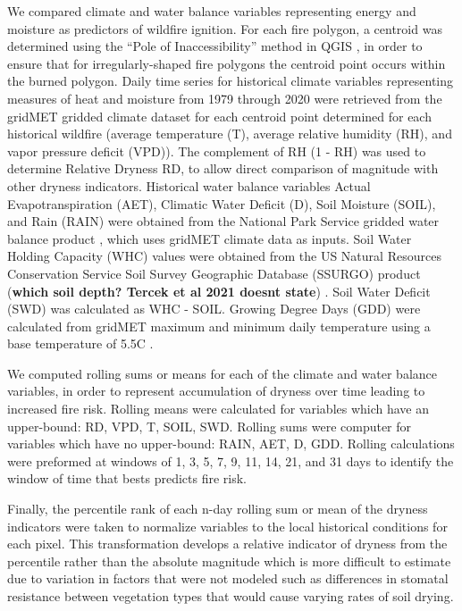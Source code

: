 \documentclass[11pt]{article}
\begin{document}

We compared climate and water balance variables representing energy and moisture as predictors of wildfire ignition. For each fire polygon, a centroid was determined using the ``Pole of Inaccessibility'' method in QGIS \citep{QGIS_software}, in order to ensure that for irregularly-shaped fire polygons the centroid point occurs within the burned polygon. Daily time series for historical climate variables representing measures of heat and moisture from 1979 through 2020 were retrieved from the gridMET gridded climate dataset \citep{abatzoglouDevelopmentGriddedSurface2013} for each centroid point determined for each historical wildfire (average temperature (T), average relative humidity (RH), and vapor pressure deficit (VPD)).  The complement of RH (1 - RH) was used to determine Relative Dryness RD, to allow direct comparison of magnitude with other dryness indicators. Historical water balance variables Actual Evapotranspiration (AET), Climatic Water Deficit (D), Soil Moisture (SOIL), and Rain (RAIN) were obtained from the National Park Service gridded water balance product \citep{tercekHistoricalChangesPlant2021}, which uses gridMET climate data as inputs. Soil Water Holding Capacity (WHC) values were obtained from the US Natural Resources Conservation Service 
Soil Survey Geographic Database (SSURGO) product (\textbf{which soil depth?  Tercek et al 2021 doesnt state}) \citep{naturalresourcesconservationserviceSoilSurveyGeographic2015}. Soil Water Deficit (SWD) was calculated as WHC - SOIL.  Growing Degree Days (GDD) were calculated from gridMET maximum and minimum daily temperature using a base temperature of 5.5\degree C \citep{mcmasterGrowingDegreedaysOne1997}.  

We computed rolling sums or means for each of the climate and water balance variables, in order to represent accumulation of dryness over time leading to increased fire risk.  Rolling means were calculated for variables which have an upper-bound: RD, VPD, T, SOIL, SWD. Rolling sums were computer for variables which have no upper-bound: RAIN, AET, D, GDD.  Rolling calculations were preformed at windows of 1, 3, 5, 7, 9, 11, 14, 21, and 31 days to identify the window of time that bests predicts fire risk.

Finally, the percentile rank of each n-day rolling sum or mean of the dryness indicators were taken to normalize variables to the local historical conditions for each pixel.  This transformation develops a relative indicator of dryness from the percentile rather than the absolute magnitude which is more difficult to estimate due to variation in factors that were not modeled such as differences in stomatal resistance between vegetation types that would cause varying rates of soil drying. 
\end{document}
